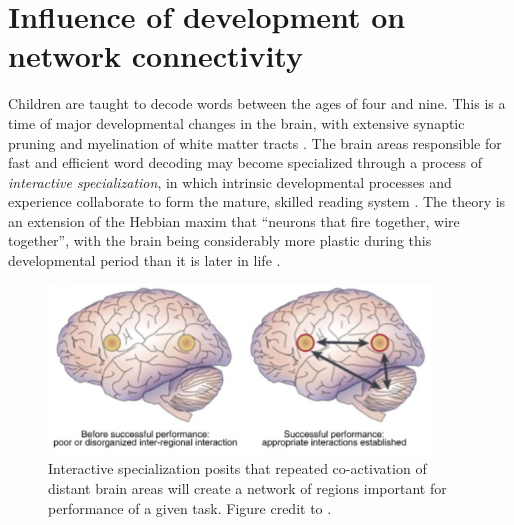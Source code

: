 \section{Influence of development on network connectivity}

Children are taught to decode words between the ages of four and nine. This is a time of major developmental changes in the brain, with extensive synaptic pruning and myelination of white matter tracts \citep{Wandell2013}. The brain areas responsible for fast and efficient word decoding may become specialized through a process of \textit{interactive specialization}, in which intrinsic developmental processes and experience collaborate to form the mature, skilled reading system \citep{Johnson2011, Klingberg2014}. The theory is an extension of the Hebbian maxim that ``neurons that fire together, wire together'', with the brain being considerably more plastic during this developmental period than it is later in life \citep{Hebb1949}.

\begin{figure}[t]
    \centering
    \includegraphics[width=4in]{images/ch1-interactive-specialization.jpg}
        \caption[Interactive specialization explains changes in activity]{Interactive specialization posits that repeated co-activation of distant brain areas will create a network of regions important for performance of a given task. Figure credit to \citep{Gaffrey2013}.}
    \label{fig:ch1-interactive-specialization}
\end{figure}

